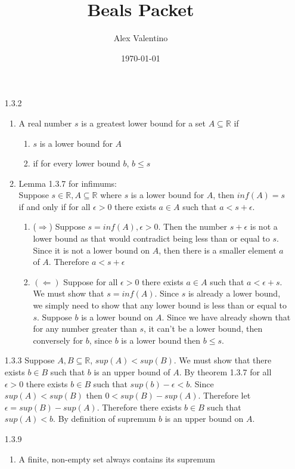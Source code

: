 \documentclass[12pt, letterpaper]{article}
\date{\today}
\author{Alex Valentino}
\title{Beals Packet}
\newcommand{\R}{\mathbb{R}}
\begin{document}
\begin{enumerate}
	\item[1.3.2]
	\begin{enumerate}
		\item A real number $s$ is a greatest lower bound for a set $A \subseteq \R$ if
		\begin{enumerate}
			\item $s$ is a lower bound for $A$
			\item if for every lower bound $b$, $b \leq s$
		\end{enumerate}
		\item Lemma 1.3.7 for infimums:\\
		Suppose $s \in \R, A \subseteq \R$ where $s$ is a lower bound for $A$, then $inf(A) = s$ if and only if for all $\epsilon > 0$ there exists $a \in A$ such that $a < s + \epsilon$. 
		\begin{enumerate}
			\item ($\Rightarrow$) Suppose $s = inf(A), \epsilon > 0$.  Then the number $s + \epsilon$ is not a lower bound as that would contradict being less than or equal to $s$.  Since it is not a lower bound on $A$, then there is a smaller element $a$ of $A$.  Therefore $a < s + \epsilon$
			\item $(\Leftarrow)$  Suppose for all $\epsilon > 0$ there exists $a \in A$ such that $a < \epsilon + s$.  We must show that $s = inf(A)$.  Since $s$ is already a lower bound, we simply need to show that any lower bound is less than or equal to $s$.  Suppose $b$ is a lower bound on $A$.  Since we have already shown that for any number greater than $s$, it can't be a lower bound, then conversely for $b$, since $b$ is a lower bound then $b \leq s$.     
		\end{enumerate}
	\end{enumerate}
	\item[1.3.3] Suppose $A,B \subseteq \R$, $sup (A) < sup(B)$.  We must show that there exists $b \in B$ such that $b$ is an upper bound of $A$. By theorem 1.3.7 for all $\epsilon > 0$ there exists $b \in B$ such that $sup (b) - \epsilon < b$.  Since $sup (A) < sup(B)$ then $0 <  sup(B)-sup (A)$.  Therefore let $\epsilon = sup(B)-sup (A)$.  Therefore there exists $b \in B$ such that $ sup(A) < b$.  By definition of supremum $b$ is an upper bound on $A$.  
	\item[1.3.9]
	\begin{enumerate}
		\item A finite, non-empty set always contains its supremum \\

\end{enumerate}
\end{enumerate}
\end{document}
